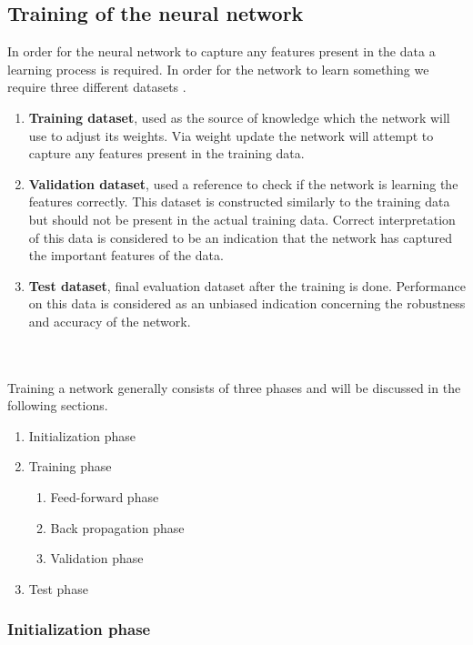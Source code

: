 \documentclass[12pt]{article}
\begin{document}
\subsection{Training of the neural network}

In order for the neural network to capture any features present in the data a learning process is required. In order for the network to learn something we require three different datasets \cite{Bishop2013, Haykin2008, Budumu, P.Murphy1991, TrevorHastie2009}.
\begin{enumerate}
	\item \textbf{Training dataset}, used as the source of knowledge which the network will use to adjust its weights. Via weight update the network will attempt to capture any features present in the training data.
	\item \textbf{Validation dataset}, used a reference to check if the network is learning the features correctly. This dataset is constructed similarly to the training data but should not be present in the actual training data. Correct interpretation of this data is considered to be an indication that the network has captured the important features of the data. 
	\item \textbf{Test dataset}, final evaluation dataset after the training is done. Performance on this data is considered as an unbiased indication concerning the robustness and accuracy of the network.
\end{enumerate}
\\
\\
Training a network generally consists of three phases and will be discussed in the following sections.
\begin{enumerate}
	\item Initialization phase
	\item Training phase
	\begin{enumerate}
		\item Feed-forward phase
		\item Back propagation phase
		\item Validation phase
	\end{enumerate}
	\item Test phase
\end{enumerate}

\subsubsection{Initialization phase}
\end{document}
